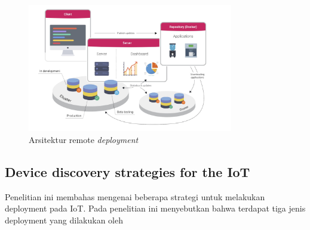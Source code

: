 \begin{figure}[h]
  \includegraphics[width=0.8\textwidth]{resources/chapter-2/arsitektur-remote-deployment.jpg}
  \caption{Arsitektur remote \textit{deployment} \parencite{RemoteDeployment}}
  \label{fig:architecture-remote-deployments}
\end{figure}


\subsection{Device discovery strategies for the IoT}
Penelitian ini membahas mengenai beberapa strategi untuk melakukan deployment pada IoT. Pada penelitian ini menyebutkan bahwa terdapat tiga jenis deployment yang dilakukan oleh

\parencite{DeviceDiscovery}


